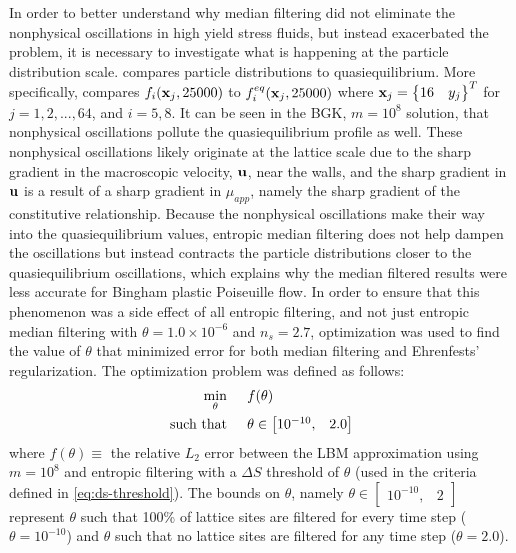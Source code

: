 In order to better understand why median filtering did not eliminate the nonphysical oscillations in high yield stress fluids, but instead exacerbated the problem, it is necessary to investigate what is happening at the particle distribution scale.
 compares particle distributions to quasiequilibrium.
More specifically,  compares $f_i(\mathbf{x}_j, 25000)$ to $f_i^{eq}(\mathbf{x}_j, 25000)$ where $\mathbf{x}_j = \begin{Bmatrix}16 & y_j\end{Bmatrix}^T$ for $j = 1, 2, ..., 64$, and $i = 5, 8$.
It can be seen \DIFdelbegin {}\DIFdelend in the BGK, $m = 10^8$ solution, that nonphysical oscillations pollute the quasiequilibrium profile as well.
These nonphysical oscillations likely originate at the lattice scale due to the sharp gradient in the macroscopic velocity, $\mathbf{u}$, near the walls, and the sharp gradient in $\mathbf{u}$ is a result of a sharp gradient in $\mu_{app}$, namely the sharp gradient of the constitutive relationship.
Because the nonphysical oscillations make their way into the quasiequilibrium values, entropic median filtering does not help dampen the oscillations but instead contracts the particle distributions closer to the quasiequilibrium oscillations, which explains why the median filtered results were less accurate for Bingham plastic Poiseuille flow.
In order to ensure that this phenomenon was a side effect of all entropic filtering, and not just entropic median filtering with $\theta = 1.0 \times 10^{-6}$ and $n_s = 2.7$, optimization was used to find the value of $\theta$ that minimized error for both median filtering and Ehrenfests' regularization.
The optimization problem was defined as follows:
\begin{align*}
  \min_\theta \hspace{0.2in} & f(\theta)\\
  \text{such that} \hspace{0.2in} & \theta \in \begin{bmatrix}10^{-10}, & 2.0\end{bmatrix}
\end{align*}
\noindent where $f(\theta) \equiv $ the relative $L_2$ error between the LBM approximation using $m = 10^8$ and entropic filtering with a $\Delta S$ threshold of $\theta$ (used in the criteria defined in \eqref{eq:ds-threshold}).
The bounds on $\theta$, namely $\theta \in \begin{bmatrix}10^{-10}, & 2\end{bmatrix}$ represent $\theta$ such that 100\% of lattice sites are filtered for every time step ($\theta = 10^{-10}$) and $\theta$ such that no lattice sites are filtered for any time step ($\theta = 2.0$).
